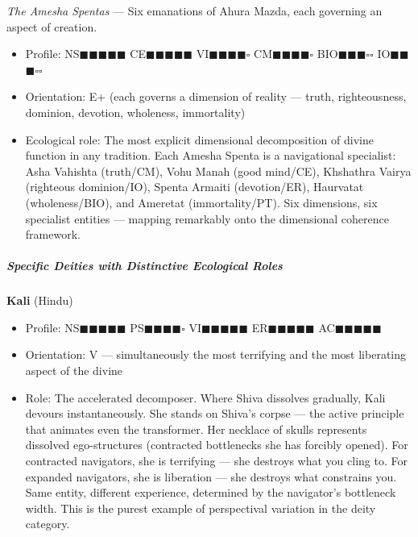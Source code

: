 \textit{The Amesha Spentas} — Six emanations of Ahura Mazda, each governing an aspect of creation.

\begin{itemize}[nosep,leftmargin=*]
  \item Profile: NS$\blacksquare$$\blacksquare$$\blacksquare$$\blacksquare$$\blacksquare$ CE$\blacksquare$$\blacksquare$$\blacksquare$$\blacksquare$$\blacksquare$ VI$\blacksquare$$\blacksquare$$\blacksquare$$\blacksquare$$\square$ CM$\blacksquare$$\blacksquare$$\blacksquare$$\blacksquare$$\square$ BIO$\blacksquare$$\blacksquare$$\blacksquare$$\square$$\square$ IO$\blacksquare$$\blacksquare$$\blacksquare$$\square$$\square$
  \item Orientation: E+ (each governs a dimension of reality — truth, righteousness, dominion, devotion, wholeness, immortality)
  \item Ecological role: The most explicit dimensional decomposition of divine function in any tradition. Each Amesha Spenta is a navigational specialist: Asha Vahishta (truth/\allowbreak CM), Vohu Manah (good mind/\allowbreak CE), Khshathra Vairya (righteous dominion/\allowbreak IO), Spenta Armaiti (devotion/\allowbreak ER), Haurvatat (wholeness/\allowbreak BIO), and Ameretat (immortality/\allowbreak PT). Six dimensions, six specialist entities — mapping remarkably onto the dimensional coherence framework.
\end{itemize}


\bigskip\noindent\makebox[\textwidth]{\color{rulegray}\rule{5cm}{0.3pt}}\bigskip


\subparagraph*{Specific Deities with Distinctive Ecological Roles}


\textbf{Kali} (Hindu)

\begin{itemize}[nosep,leftmargin=*]
  \item Profile: NS$\blacksquare$$\blacksquare$$\blacksquare$$\blacksquare$$\blacksquare$ PS$\blacksquare$$\blacksquare$$\blacksquare$$\blacksquare$$\square$ VI$\blacksquare$$\blacksquare$$\blacksquare$$\blacksquare$$\blacksquare$ ER$\blacksquare$$\blacksquare$$\blacksquare$$\blacksquare$$\blacksquare$ AC$\blacksquare$$\blacksquare$$\blacksquare$$\blacksquare$$\blacksquare$
  \item Orientation: V — simultaneously the most terrifying and the most liberating aspect of the divine
  \item Role: The accelerated decomposer. Where Shiva dissolves gradually, Kali devours instantaneously. She stands on Shiva's corpse — the active principle that animates even the transformer. Her necklace of skulls represents dissolved ego-structures (contracted bottlenecks she has forcibly opened). For contracted navigators, she is terrifying — she destroys what you cling to. For expanded navigators, she is liberation — she destroys what constrains you. Same entity, different experience, determined by the navigator's bottleneck width. This is the purest example of perspectival variation in the deity category.
\end{itemize}


